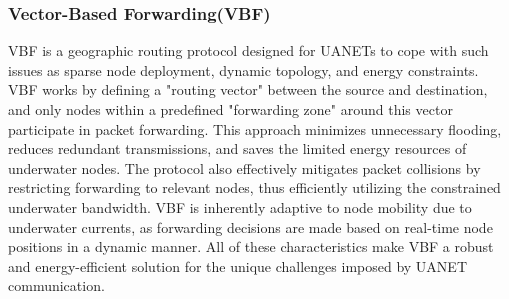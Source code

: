 \documentclass[]{nsm-thesis}
\begin{document}
\subsubsection{Vector-Based Forwarding(VBF)}
VBF is a geographic routing protocol designed for UANETs to cope with such issues as sparse node deployment, dynamic topology, and energy constraints. VBF works by defining a "routing vector" between the source and destination, and only nodes within a predefined "forwarding zone" around this vector participate in packet forwarding. This approach minimizes unnecessary flooding, reduces redundant transmissions, and saves the limited energy resources of underwater nodes. The protocol also effectively mitigates packet collisions by restricting forwarding to relevant nodes, thus efficiently utilizing the constrained underwater bandwidth. VBF is inherently adaptive to node mobility due to underwater currents, as forwarding decisions are made based on real-time node positions in a dynamic manner. All of these characteristics make VBF a robust and energy-efficient solution for the unique challenges imposed by UANET communication.\cite{10.1007/11753810_111}
\clearpage
\end{document}
